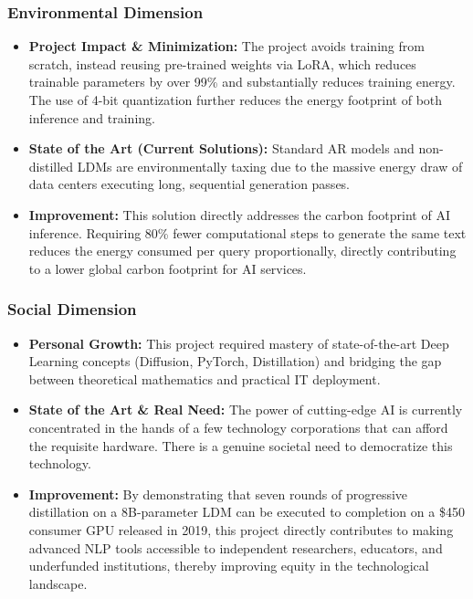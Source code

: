 \documentclass[11pt, a4paper]{article}
\begin{document}
\subsubsection*{Environmental Dimension}
\begin{itemize}
    \item \textbf{Project Impact \& Minimization:} The project avoids training from scratch, instead reusing pre-trained weights via LoRA, which reduces trainable parameters by over 99\% and substantially reduces training energy. The use of 4-bit quantization further reduces the energy footprint of both inference and training.
    \item \textbf{State of the Art (Current Solutions):} Standard AR models and non-distilled LDMs are environmentally taxing due to the massive energy draw of data centers executing long, sequential generation passes.
    \item \textbf{Improvement:} This solution directly addresses the carbon footprint of AI inference. Requiring 80\% fewer computational steps to generate the same text reduces the energy consumed per query proportionally, directly contributing to a lower global carbon footprint for AI services.
\end{itemize}

\subsubsection*{Social Dimension}
\begin{itemize}
    \item \textbf{Personal Growth:} This project required mastery of state-of-the-art Deep Learning concepts (Diffusion, PyTorch, Distillation) and bridging the gap between theoretical mathematics and practical IT deployment.
    \item \textbf{State of the Art \& Real Need:} The power of cutting-edge AI is currently concentrated in the hands of a few technology corporations that can afford the requisite hardware. There is a genuine societal need to democratize this technology.
    \item \textbf{Improvement:} By demonstrating that seven rounds of progressive distillation on a 8B-parameter LDM can be executed to completion on a \$450 consumer GPU released in 2019, this project directly contributes to making advanced NLP tools accessible to independent researchers, educators, and underfunded institutions, thereby improving equity in the technological landscape.
\end{itemize}
\end{document}
